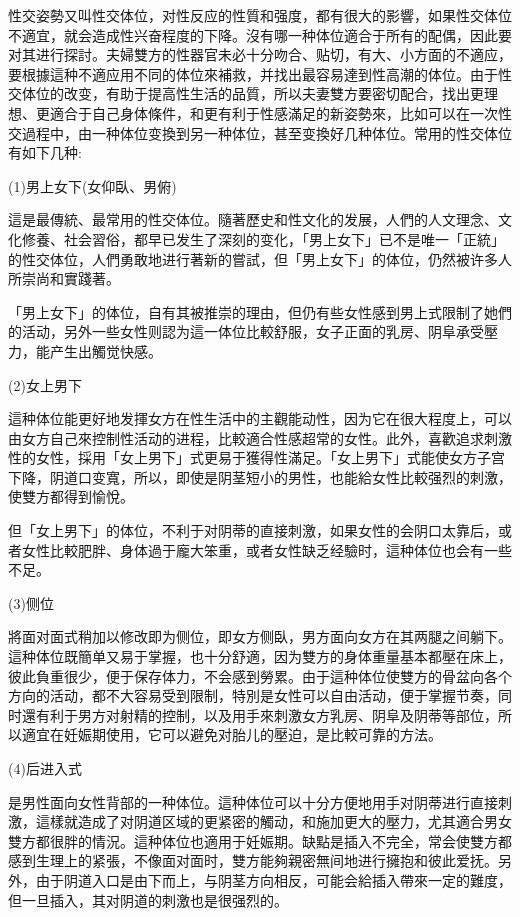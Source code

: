 \documentclass[12pt,UTF8]{ctexbook}
\begin{document}
性交姿勢又叫性交体位，对性反应的性質和强度，都有很大的影響，如果性交体位不適宜，就会造成性兴奋程度的下降。沒有哪一种体位適合于所有的配偶，因此要对其进行探討。夫婦雙方的性器官未必十分吻合、贴切，有大、小方面的不適应，要根據這种不適应用不同的体位來補救，并找出最容易達到性高潮的体位。由于性交体位的改变，有助于提高性生活的品質，所以夫妻雙方要密切配合，找出更理想、更適合于自己身体條件，和更有利于性感滿足的新姿勢來，比如可以在一次性交過程中，由一种体位变換到另一种体位，甚至变換好几种体位。常用的性交体位有如下几种:

(1)男上女下(女仰臥、男俯)

這是最傳統、最常用的性交体位。隨著歷史和性文化的发展，人們的人文理念、文化修養、社会習俗，都早已发生了深刻的变化，「男上女下」已不是唯一「正統」的性交体位，人們勇敢地进行著新的嘗試，但「男上女下」的体位，仍然被许多人所崇尚和實踐著。

「男上女下」的体位，自有其被推崇的理由，但仍有些女性感到男上式限制了她們的活动，另外一些女性则認为這一体位比較舒服，女子正面的乳房、阴阜承受壓力，能产生出觸觉快感。

(2)女上男下

這种体位能更好地发揮女方在性生活中的主觀能动性，因为它在很大程度上，可以由女方自己來控制性活动的进程，比較適合性感超常的女性。此外，喜歡追求刺激性的女性，採用「女上男下」式更易于獲得性滿足。「女上男下」式能使女方子宫下降，阴道口变寬，所以，即使是阴茎短小的男性，也能給女性比較强烈的刺激，使雙方都得到愉悅。

但「女上男下」的体位，不利于对阴蒂的直接刺激，如果女性的会阴口太靠后，或者女性比較肥胖、身体過于龐大笨重，或者女性缺乏经驗时，這种体位也会有一些不足。

(3)侧位

將面对面式稍加以修改即为侧位，即女方侧臥，男方面向女方在其两腿之间躺下。這种体位既簡单又易于掌握，也十分舒適，因为雙方的身体重量基本都壓在床上，彼此負重很少，便于保存体力，不会感到勞累。由于這种体位使雙方的骨盆向各个方向的活动，都不大容易受到限制，特別是女性可以自由活动，便于掌握节奏，同时還有利于男方对射精的控制，以及用手來刺激女方乳房、阴阜及阴蒂等部位，所以適宜在妊娠期使用，它可以避免对胎儿的壓迫，是比較可靠的方法。

(4)后进入式

是男性面向女性背部的一种体位。這种体位可以十分方便地用手对阴蒂进行直接刺激，這樣就造成了对阴道区域的更紧密的觸动，和施加更大的壓力，尤其適合男女雙方都很胖的情況。這种体位也適用于妊娠期。缺點是插入不完全，常会使雙方都感到生理上的紧張，不像面对面时，雙方能夠親密無间地进行擁抱和彼此爱抚。另外，由于阴道入口是由下而上，与阴茎方向相反，可能会給插入帶來一定的難度，但一旦插入，其对阴道的刺激也是很强烈的。
\end{document}
